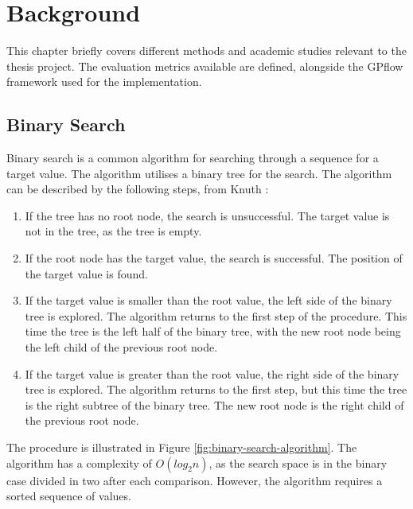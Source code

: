 \chapter{Background}
\label{cha:background}

This chapter briefly covers different methods and academic studies relevant to the thesis project.
The evaluation metrics available are defined, alongside the GPflow framework used for the implementation.

\section{Binary Search}
Binary search is a common algorithm for searching through a sequence for a target value.
The algorithm utilises a binary tree for the search.
The algorithm can be described by the following steps, from Knuth \cite{Knuth1971}:
\begin{enumerate}
    \item If the tree has no root node, the search is unsuccessful. 
    The target value is not in the tree, as the tree is empty.
    \item If the root node has the target value, the search is successful.
    The position of the target value is found.
    \item If the target value is smaller than the root value, the left side of the binary tree is explored.
    The algorithm returns to the first step of the procedure.
    This time the tree is the left half of the binary tree, with the new root node being the left child of the previous root node.
    \item If the target value is greater than the root value, the right side of the binary tree is explored.
    The algorithm returns to the first step, but this time the tree is the right subtree of the binary tree.
    The new root node is the right child of the previous root node.
\end{enumerate}
The procedure is illustrated in Figure \ref{fig:binary-search-algorithm}.
The algorithm has a complexity of $O(log_2 n)$, as the search space is in the binary case divided in two after each comparison.
However, the algorithm requires a sorted sequence of values.

